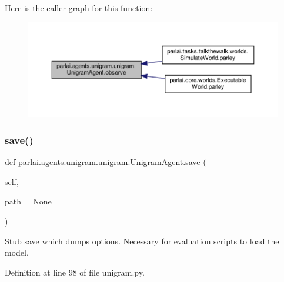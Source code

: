 Here is the caller graph for this function\+:
\nopagebreak
\begin{figure}[H]
\begin{center}
\leavevmode
\includegraphics[width=350pt]{classparlai_1_1agents_1_1unigram_1_1unigram_1_1UnigramAgent_a2c0cb628c4cc600b0968e6161d7a139a_icgraph}
\end{center}
\end{figure}
\mbox{\label{classparlai_1_1agents_1_1unigram_1_1unigram_1_1UnigramAgent_ae0178adc22b61bc37632eed426f853df}} 
\subsubsection{\texorpdfstring{save()}{save()}}
{\footnotesize\ttfamily def parlai.\+agents.\+unigram.\+unigram.\+Unigram\+Agent.\+save (\begin{DoxyParamCaption}\item[{}]{self,  }\item[{}]{path = {\ttfamily None} }\end{DoxyParamCaption})}

\begin{DoxyVerb}Stub save which dumps options. Necessary for evaluation scripts to
load the model.
\end{DoxyVerb}
 

Definition at line 98 of file unigram.\+py.



